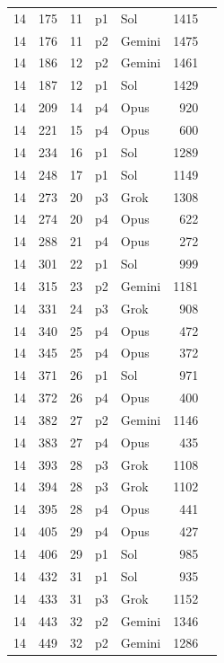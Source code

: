 \begin{longtable}{r r r l l r L{2.2in}}
14 & 175 & 11 & p1 & Sol & 1415 &  \\
14 & 176 & 11 & p2 & Gemini & 1475 &  \\
14 & 186 & 12 & p2 & Gemini & 1461 &  \\
14 & 187 & 12 & p1 & Sol & 1429 &  \\
14 & 209 & 14 & p4 & Opus & 920 &  \\
14 & 221 & 15 & p4 & Opus & 600 &  \\
14 & 234 & 16 & p1 & Sol & 1289 &  \\
14 & 248 & 17 & p1 & Sol & 1149 &  \\
14 & 273 & 20 & p3 & Grok & 1308 &  \\
14 & 274 & 20 & p4 & Opus & 622 &  \\
14 & 288 & 21 & p4 & Opus & 272 &  \\
14 & 301 & 22 & p1 & Sol & 999 &  \\
14 & 315 & 23 & p2 & Gemini & 1181 &  \\
14 & 331 & 24 & p3 & Grok & 908 &  \\
14 & 340 & 25 & p4 & Opus & 472 &  \\
14 & 345 & 25 & p4 & Opus & 372 &  \\
14 & 371 & 26 & p1 & Sol & 971 &  \\
14 & 372 & 26 & p4 & Opus & 400 &  \\
14 & 382 & 27 & p2 & Gemini & 1146 &  \\
14 & 383 & 27 & p4 & Opus & 435 &  \\
14 & 393 & 28 & p3 & Grok & 1108 &  \\
14 & 394 & 28 & p3 & Grok & 1102 &  \\
14 & 395 & 28 & p4 & Opus & 441 &  \\
14 & 405 & 29 & p4 & Opus & 427 &  \\
14 & 406 & 29 & p1 & Sol & 985 &  \\
14 & 432 & 31 & p1 & Sol & 935 &  \\
14 & 433 & 31 & p3 & Grok & 1152 &  \\
14 & 443 & 32 & p2 & Gemini & 1346 &  \\
14 & 449 & 32 & p2 & Gemini & 1286 &  \\

\end{longtable}
